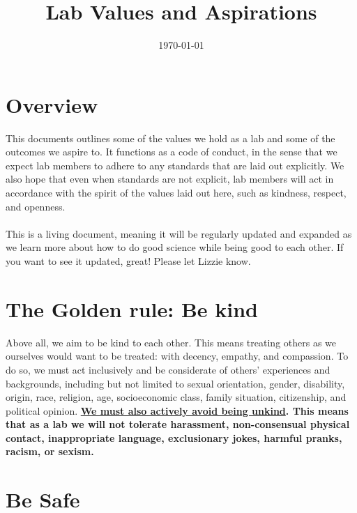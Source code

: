 \documentclass[11pt,a4paper,oneside]{article}
\begin{document}
\title{Lab Values and Aspirations\\}
\date{\today}
\maketitle


\section*{Overview}

This documents outlines some of the values we hold as a lab and some of the outcomes we aspire to. It functions as a code of conduct, in the sense that we expect lab members to adhere to any standards that are laid out explicitly. We also hope that even when standards are not explicit, lab members will act in accordance with the spirit of the values laid out here, such as kindness, respect, and openness.\\
\\
\noindent
This is a living document, meaning it will be regularly updated and expanded as we learn more about how to do good science while being good to each other. If you want to see it updated, great! Please let Lizzie know.

\section{The Golden rule: Be kind}

Above all, we aim to be kind to each other. This means treating others as we ourselves would want to be treated: with decency, empathy, and compassion. To do so, we must act inclusively and be considerate of others’ experiences and backgrounds, including but not limited to sexual orientation, gender, disability, origin, race, religion, age, socioeconomic class, family situation, citizenship, and political opinion. \textbf{\underline{We must also actively avoid being unkind}. This means that as a lab we will not tolerate harassment, non-consensual physical contact, inappropriate language, exclusionary jokes, harmful pranks, racism, or sexism.}

\section{Be Safe}
\end{document}
